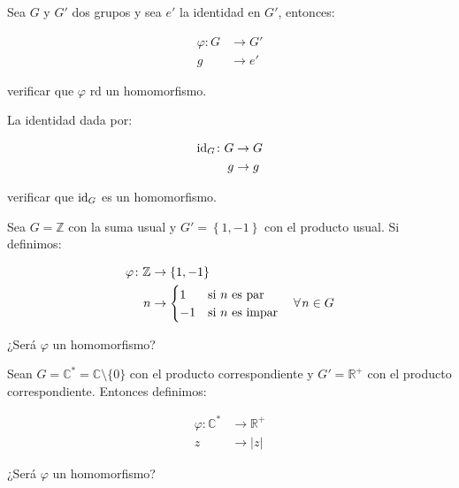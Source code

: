         \begin{ejercicio}
            Sea $G$ y $G'$ dos grupos y sea $e'$ la identidad en $G'$, entonces:

            \begin{align*}
                \varphi \colon G &\to G' \\
                g &\to e'
            \end{align*}

            verificar que $\varphi$ rd un homomorfismo.
        \end{ejercicio}

        \begin{ejercicio}
            La identidad dada por:

            \begin{align*}
                \operatorname{id}_G \colon G &\to G \\
                g &\to g
            \end{align*}

            verificar que $\operatorname{id}_G$ es un homomorfismo.
        \end{ejercicio}

        \begin{ejercicio}
            Sea $G = \mathbb{Z}$ con la suma usual y $G' = \left\{ 1, -1 \right\}$ con el producto usual. Si definimos:

            \begin{align*}
                \varphi \colon \mathbb{Z} &\to \left\{ 1, -1 \right\} \\
                n &\to
                \begin{cases}
                    1 & \text{si } n \text{ es par} \\
                    -1 & \text{si } n \text{ es impar}
                \end{cases} \quad \forall \mkern2mu n \in G
            \end{align*}

            ¿Será $\varphi$ un homomorfismo?
        \end{ejercicio}

        \begin{ejercicio}
            Sean $G = \mathbb{C}^* = \mathbb{C} \setminus \{0\}$ con el producto correspondiente y $G' = \mathbb{R}^+$ con el producto correspondiente. Entonces definimos:

            \begin{align*}
                \varphi \colon \mathbb{C}^* &\to \mathbb{R}^+ \\
                z &\to |z|
            \end{align*}

            ¿Será $\varphi$ un homomorfismo?
        \end{ejercicio}


